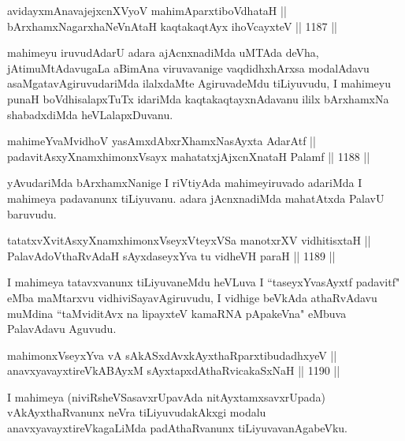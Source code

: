 \begin{shl}
avidayxmAnavajejxcnXVyoV mahimAparxtiboVdhataH || \\
bArxhamxNagarxhaNeVnAtaH kaqtakaqtAyx ihoVcayxteV \hfill || 1187 ||  
\end{shl}

\begin{artha}
mahimeyu iruvudAdarU adara ajAcnxnadiMda uMTAda deVha, jAtimuMtAdavugaLa aBimAna viruvavanige vaqdidhxhArxsa modalAdavu asaMgatavAgiruvudariMda ilalxdaMte AgiruvadeMdu tiLiyuvudu, I mahimeyu punaH boVdhisalapxTuTx idariMda kaqtakaqtayxnAdavanu ililx bArxhamxNa shabadxdiMda heVLalapxDuvanu.
\end{artha}


\begin{shl}
mahimeYvaMvidhoV yasAmxdAbxrXhamxNasAyxta AdarAtf || \\
padavitAsxyXnamxhimonxV\s sayx mahatatxjAjxcnXnataH Palamf \hfill || 1188 ||  
\end{shl}

\begin{artha}
yAvudariMda bArxhamxNanige I riVtiyAda mahimeyiruvado adariMda I mahimeya padavanunx tiLiyuvanu. adara jAcnxnadiMda mahatAtxda PalavU baruvudu.
\end{artha}


\begin{shl}
tatatxvXvitAsxyXnamxhimonxV\s seyxVteyxVSa manotxrXV vidhitisxtaH || \\
PalavAdoV\s thaRvAdaH sAyxdaseyxYva tu vidheVH paraH \hfill || 1189 ||  
\end{shl}

\begin{artha}
I mahimeya tatavxvanunx tiLiyuvaneMdu heVLuva I ``taseyxYvasAyxtf padavitf" eMba maMtarxvu vidhiviSayavAgiruvudu, I vidhige beVkAda athaRvAdavu muMdina ``taMviditAvx na lipayxteV kamaRNA pApakeVna" eMbuva PalavAdavu Aguvudu.
\end{artha}

\begin{shl}
mahimonxV\s seyxYva vA sAkASxdAvxkAyxthaRparxtibudadhxyeV || \\
anavxyavayxtireVkABAyxM sAyxtapxdAthaRvicakaSxNaH \hfill || 1190 ||  
\end{shl}

\begin{artha}
I mahimeya (niviRsheVSasavxrUpavAda nitAyxtamxsavxrUpada) vAkAyxthaRvanunx neVra tiLiyuvudakAkxgi modalu anavxyavayxtireVkagaLiMda padAthaRvanunx tiLiyuvavanAgabeVku.
\end{artha}

